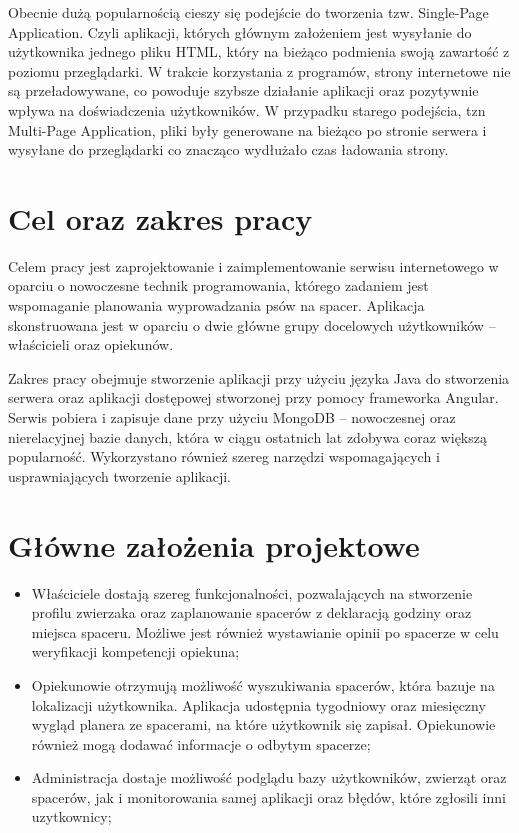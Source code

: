 
Obecnie dużą popularnością cieszy się podejście do tworzenia tzw. Single-Page Application. Czyli aplikacji, których głównym założeniem jest wysyłanie do użytkownika jednego pliku HTML, który na bieżąco podmienia swoją zawartość z poziomu przeglądarki. W trakcie korzystania z programów, strony internetowe nie są przeładowywane, co powoduje szybsze działanie aplikacji oraz pozytywnie wpływa na doświadczenia użytkowników. W przypadku starego podejścia, tzn Multi-Page Application, pliki były generowane na bieżąco po stronie serwera i wysyłane do przeglądarki co znacząco wydłużało czas ładowania strony.
\section{Cel oraz zakres pracy}
Celem pracy jest zaprojektowanie i zaimplementowanie serwisu internetowego w oparciu o  nowoczesne technik programowania, którego zadaniem jest wspomaganie planowania wyprowadzania psów na spacer. Aplikacja skonstruowana jest w oparciu o dwie główne grupy docelowych użytkowników -- właścicieli oraz opiekunów. 

Zakres pracy obejmuje stworzenie aplikacji przy użyciu języka Java do stworzenia serwera oraz aplikacji dostępowej stworzonej przy pomocy frameworka Angular. Serwis pobiera i zapisuje dane przy użyciu MongoDB -- nowoczesnej oraz nierelacyjnej bazie danych, która w ciągu ostatnich lat zdobywa coraz większą popularność. Wykorzystano również szereg narzędzi wspomagających i usprawniających tworzenie aplikacji.

\section{Główne założenia projektowe}
\begin{itemize}
    \item Właściciele dostają szereg funkcjonalności, pozwalających na stworzenie profilu zwierzaka oraz zaplanowanie spacerów z deklaracją godziny oraz miejsca spaceru. Możliwe jest również wystawianie opinii po spacerze w celu weryfikacji kompetencji opiekuna;
    \item Opiekunowie otrzymują możliwość wyszukiwania spacerów, która bazuje na lokalizacji użytkownika. Aplikacja udostępnia tygodniowy oraz miesięczny wygląd planera ze spacerami, na które użytkownik się zapisał. Opiekunowie również mogą dodawać informacje o odbytym spacerze;
    \item Administracja dostaje możliwość podglądu bazy użytkowników, zwierząt oraz spacerów, jak i monitorowania samej aplikacji oraz błędów, które zgłosili inni uzytkownicy;
\end{itemize}
